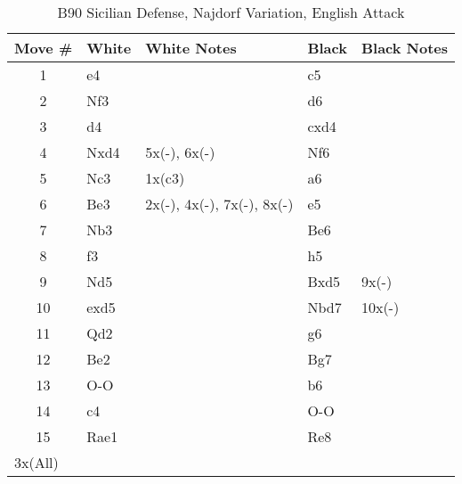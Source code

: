 \begin{table}[htbp]
\centering
\scriptsize
\caption[]{B90 Sicilian Defense, Najdorf Variation, English Attack}
\begin{tabular}{|c|l|p{5cm}|l|p{5cm}|}
\hline
\textbf{Move \#} & \textbf{White} & \textbf{White Notes} & \textbf{Black} & \textbf{Black Notes} \\
\hline
1  & e4    &                     & c5    &                        \\
2  & Nf3   &                     & d6    &                        \\
3  & d4    &                     & cxd4  &                        \\
4  & Nxd4  & 5x(-), 6x(-)        & Nf6   &                        \\
5  & Nc3   & 1x(c3)              & a6    &                        \\
6  & Be3   & 2x(-), 4x(-), 7x(-), 8x(-) & e5    &                        \\
7  & Nb3   &                     & Be6   &                        \\
8  & f3    &                     & h5    &                        \\
9  & Nd5   &                     & Bxd5  & 9x(-)                  \\
10 & exd5  &                     & Nbd7  & 10x(-)                 \\
11 & Qd2   &                     & g6    &                        \\
12 & Be2   &                     & Bg7   &                        \\
13 & O-O   &                     & b6    &                        \\
14 & c4    &                     & O-O   &                        \\
15 & Rae1  &                     & Re8   &                        \\
\hline
\multicolumn{5}{|l|}{3x(All)} \\
\hline
\end{tabular}
\end{table}

